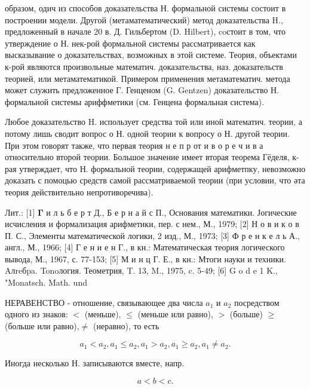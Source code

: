 \documentclass[10pt]{article}
\begin{document}
образом, одич из способов доказательства Н. формальной системы состоит в построении модели. Другой (метаматематический) метод доказательства H., предложенный в начале 20 в. Д. Гильбертом (D. Hilbert), coстоит в том, что утверждение о Н. нек-рой формальной системы рассматривается как высказывание о доказательствах, возможных в этой системе. Теория, объектами к-рой являются произвольные математич. доказательства, наз. доказательств теорией, или метаматематикой. Примером применения метаматематич. метода может служить предложенное Г. Генценом (G. Gentzen) доказательство Н. формальной системы ариффметики (см. Генцена формальная система).



Любое доказательство H. использует средства той или иной математич. теории, а потому лишь сводит вопрос о Н. одной теории к вопросу о Н. другой теории. При этом говорят также, что первая теория н е п р от и в о р е ч и в а относительно второй теории. Большое значение имеет вторая теорема Гёделя, к-рая утверждает, что Н. формальной теории, содержащей арифметпку, невозможно доказать с помоцью средств самой рассматриваемой теории (при условии, что әта теория действительно непротиворечива).



Лит.: [1] $\boldsymbol{\Gamma}$ и л ь б е р т Д., Б е р н а й с П., Основания математики. Јогические исчисления и формализация арифметики, пер. с нем., М., 1979; [2] Н о в и к о в П. С., Элементы математической логики, 2 изд., М., 1973; [3] Ф р е н к е л ь А., англ., М., 1966; [4] Г е н и е н Г., в кн.: Математическая теория логического вывода, М., 1967, с. 77-153; [5] М и н ц Г. Е., в кн.: Мтоги науки и техники. Aлreбpa. Tonoлогия. Теометрия, T. 13, M., 1975, c. 5-49; [6] G o d e 1 K., "Monatsch. Math. und



НЕРАВЕНСТВО - отношение, связывающее два числа $a_{1}$ и $a_{2}$ посредством одного из знаков: $<$ (меньше), $\leqslant$ (меньше или равно), $>$ (больше) $\geqslant$ (больше или равно),$\neq$ (неравно), то есть



\[

a_{1}<a_{2}, a_{1} \leqslant a_{2}, a_{1}>a_{2}, a_{1} \geqslant a_{2}, a_{1} \neq a_{2} .

\]



Иногда несколько Н. записываются вместе, напр.



\[

a<b<c .

\]
\end{document}
